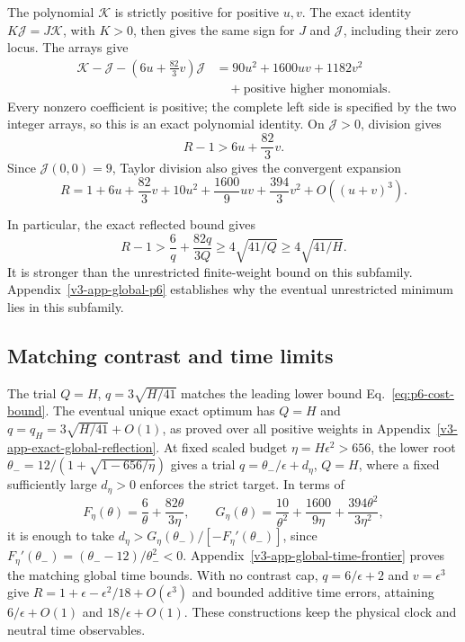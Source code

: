 \documentclass[aps,pre,reprint,amsmath,amssymb,longbibliography]{revtex4-2}
\begin{document}
The polynomial $\mathcal K$ is strictly positive for positive $u,v$.
The exact identity $K\mathcal J=J\mathcal K$, with $K>0$,
then gives the same sign for $J$ and $\mathcal J$, including their zero locus.
The arrays give
\begin{equation}
 \begin{aligned}
 \mathcal K-\mathcal J-\left(6u+\frac{82}{3}v\right)\mathcal J
 &=90u^2+1600uv+1182v^2\\
 &\quad+\text{positive higher monomials}.
 \end{aligned}
 \label{eq:app-p6-positive-certificate}
\end{equation}
Every nonzero coefficient is positive; the complete left side is
specified by the two integer arrays, so this is an exact polynomial identity. On $\mathcal J>0$, division gives
\begin{equation}
 R-1>6u+\frac{82}{3}v.
 \label{eq:app-p6-strict-bound}
\end{equation}
Since $\mathcal J(0,0)=9$, Taylor division also gives the convergent expansion
\begin{equation}
 R=1+6u+\frac{82}{3}v+10u^2+
 \frac{1600}{9}uv+\frac{394}{3}v^2+O((u+v)^3).
 \label{eq:app-p6-taylor}
\end{equation}

In particular, the exact reflected bound gives
\begin{equation}
 R-1>\frac6q+\frac{82q}{3Q}
       \ge4\sqrt{41/Q}\ge4\sqrt{41/H}.
 \label{eq:p6-cost-bound}
\end{equation}
It is stronger than the unrestricted finite-weight bound on this
subfamily. Appendix~\ref{v3-app-global-p6} establishes why the eventual
unrestricted minimum lies in this subfamily.

\subsection{Matching contrast and time limits}
The trial $Q=H$, $q=3\sqrt{H/41}$ matches the leading lower bound
Eq.~\eqref{eq:p6-cost-bound}. The eventual unique exact optimum has
$Q=H$ and $q=q_H=3\sqrt{H/41}+O(1)$, as proved over all positive
weights in Appendix~\ref{v3-app-exact-global-reflection}.
At fixed scaled budget $\eta=H\epsilon^2>656$, the lower root
$\theta_-=12/(1+\sqrt{1-656/\eta})$ gives a trial
$q=\theta_-/\epsilon+d_\eta$, $Q=H$, where a fixed sufficiently
large $d_\eta>0$ enforces the strict target. In terms of
\begin{equation}
 F_\eta(\theta)=\frac6\theta+\frac{82\theta}{3\eta},\qquad
 G_\eta(\theta)=\frac{10}{\theta^2}+\frac{1600}{9\eta}
                         +\frac{394\theta^2}{3\eta^2},
\end{equation}
it is enough to take
$d_\eta>G_\eta(\theta_-)/[-F_\eta'(\theta_-)]$, since
$F_\eta'(\theta_-)=(\theta_--12)/\theta_-^2<0$.
Appendix~\ref{v3-app-global-time-frontier} proves the matching global
time bounds. With no contrast cap, $q=6/\epsilon+2$ and
$v=\epsilon^3$ give
$R=1+\epsilon-\epsilon^2/18+O(\epsilon^3)$ and bounded additive
time errors, attaining $6/\epsilon+O(1)$ and $18/\epsilon+O(1)$.
These constructions keep the physical clock and neutral time observables.
\end{document}
